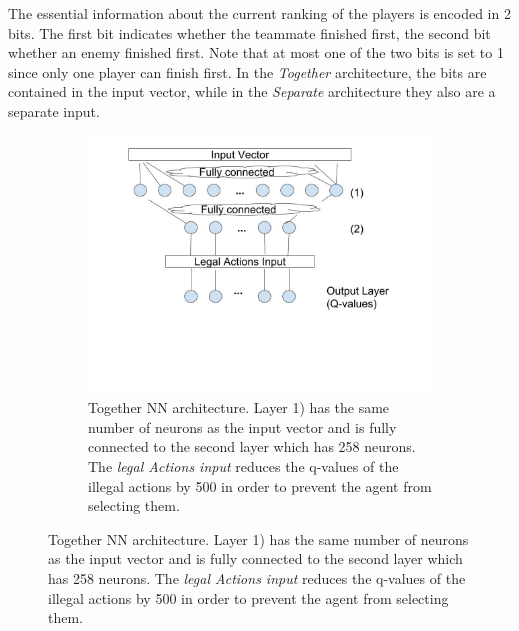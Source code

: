 The essential information about the current ranking of the players is encoded in 2 bits. The first bit indicates whether the teammate finished first, the second bit whether an enemy finished first. Note that at most one of the two bits is set to 1 since only one player can finish first. In the \textit{Together} architecture, the bits are contained in the input vector, while in the \textit{Separate} architecture they also are a separate input.



\begin{figure}[hb]
    \begin{center}
        \begin{subfigure}[h]{.8\textwidth}\includegraphics[width=\textwidth]{images/nnarchi_together}
            \caption{Together NN architecture. Layer 1) has the same number of neurons as the input vector and is fully connected to the second layer which has 258 neurons. The \textit{legal Actions input} reduces the q-values of the illegal actions by 500 in order to prevent the agent from selecting them. }
            \label{fig:archi1}
        \end{subfigure}


\end{center}
\end{figure}
